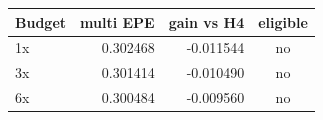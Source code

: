 \begin{tabular}{lrrc}
Budget & multi EPE & gain vs H4 & eligible\\
\hline
1x & 0.302468 & -0.011544 & no \\
3x & 0.301414 & -0.010490 & no \\
6x & 0.300484 & -0.009560 & no \\
\end{tabular}
